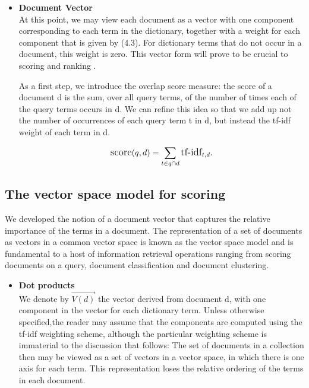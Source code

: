 \begin{itemize}
     \item \textbf{Document Vector}\\
    At this point, we may view each document as a vector with one component
    corresponding to each term in the dictionary, together with a weight for each component that is given by (4.3). 
    For dictionary terms that do not occur in a document, this weight is zero. This vector form will prove to be crucial to scoring and ranking .

    As a first step, we introduce the overlap score measure: the score of a document d is the sum, over all query terms, of the number of times each of the query terms occurs in d. We can refine this idea so that we add up not the number of occurrences of each query term t in d, but instead the tf-idf weight of each term in d.
   
   \begin{equation}
        \large
         \text{score}(q,d) =\sum_{t \in q\cap d} \text{tf-idf}_{t,d}. \end{equation}
\end{itemize}


\subsection{The vector space model for scoring}

We developed the notion of a document vector that captures the relative importance of the terms in a document. 
The representation of a set of documents as vectors in a common vector space is known as the vector space model and is fundamental to a host of information retrieval operations ranging from scoring documents on a query, document classification and document clustering.

\begin{itemize}
     \item \textbf{Dot products}\\
     We denote by $\vec{V(d)}$ the vector derived from document d, with one component in the vector for each dictionary term. Unless otherwise specified,the reader may assume that the components are computed using the tf-idf weighting scheme, although the particular weighting scheme is immaterial to the discussion that follows: 
     The set of documents in a collection then may be viewed as a set of vectors in a vector space, in which there is one axis for each term.              This representation loses the relative ordering of the terms in each document.
      
     
\end{itemize}

